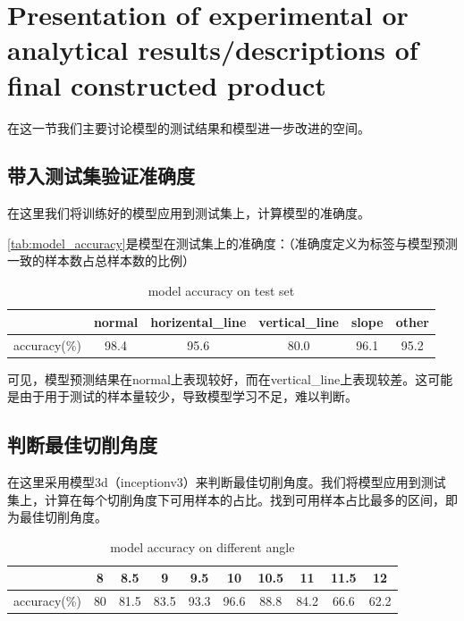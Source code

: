 \section{Presentation of experimental or analytical results/descriptions of final constructed product}
在这一节我们主要讨论模型的测试结果和模型进一步改进的空间。


\subsection{带入测试集验证准确度}

在这里我们将训练好的模型应用到测试集上，计算模型的准确度。

\autoref{tab:model_accuracy}是模型在测试集上的准确度：（准确度定义为标签与模型预测一致的样本数占总样本数的比例）

\begin{table}
\centering
\caption{model accuracy on test set}
\begin{tabular}{cccccc}
    \toprule
    & normal & horizental\_line & vertical\_line & slope & other \\
    \midrule
    accuracy(\%) & 98.4 & 95.6 & 80.0 & 96.1 & 95.2 \\
    \bottomrule
\end{tabular}
\label{tab:model_accuracy}
\end{table}

可见，模型预测结果在normal上表现较好，而在vertical\_line上表现较差。这可能是由于用于测试的样本量较少，导致模型学习不足，难以判断。


\subsection{判断最佳切削角度}

在这里采用模型3d（inceptionv3）来判断最佳切削角度。我们将模型应用到测试集上，计算在每个切削角度下可用样本的占比。找到可用样本占比最多的区间，即为最佳切削角度。

\begin{table}
    \centering
    \caption{model accuracy on different angle}
    \begin{tabular}{cccccccccc}
        \toprule
        & 8 & 8.5 & 9 & 9.5 & 10 & 10.5 & 11 & 11.5 & 12 \\
        \midrule
        accuracy(\%) & 80 & 81.5 & 83.5 & 93.3 & 96.6 & 88.8 & 84.2 & 66.6 & 62.2 \\ 
        \bottomrule
    \end{tabular}
    \label{tab:model_accuracy_angle}
    \end{table}

